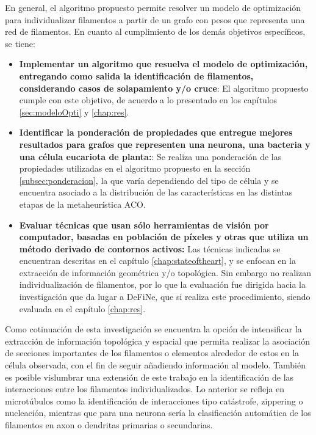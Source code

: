 En general, el algoritmo propuesto permite resolver un modelo de optimizaci\'on para individualizar filamentos a partir de un grafo con pesos que representa una red de filamentos. En cuanto al cumplimiento de los dem\'as objetivos espec\'ificos, se tiene:
\begin{itemize}
    \item {\bf Implementar un algoritmo que resuelva el modelo de optimizaci\'on, entregando como salida la identificaci\'on de filamentos, considerando casos de solapamiento y/o cruce}: El algoritmo propuesto cumple con este objetivo, de acuerdo a lo presentado en los cap\'itulos \ref{sec:modeloOpti} y \ref{chap:res}.
    
    \item {\bf Identificar la ponderaci\'on de propiedades que entregue mejores resultados para grafos que representen una neurona, una bacteria y una c\'elula eucariota de planta:}: Se realiza una ponderaci\'on de las propiedades utilizadas en el algoritmo propuesto en la secci\'on \ref{subsec:ponderacion}, la que var\'ia dependiendo del tipo de c\'elula y se encuentra asociado a la distribuci\'on de las caracter\'isticas en las distintas etapas de la metaheur\'istica ACO.
    
    \item {\bf Evaluar t\'ecnicas que usan s\'olo herramientas de visi\'on por computador, basadas en poblaci\'on de p\'ixeles y otras que utiliza un m\'etodo derivado de contornos activos:} Las t\'ecnicas indicadas se encuentran descritas en el cap\'itulo \ref{chap:stateoftheart}, y se enfocan en la extracci\'on de informaci\'on geom\'etrica y/o topol\'ogica. Sin embargo no realizan individualizaci\'on de filamentos, por lo que la evaluaci\'on fue dirigida hacia la investigaci\'on que da lugar a DeFiNe, que si realiza este procedimiento, siendo evaluada en el cap\'itulo \ref{chap:res}.
\end{itemize}


Como cotinuaci\'on de esta investigaci\'on se encuentra la opci\'on de intensificar la extracci\'on de informaci\'on topol\'ogica y espacial que permita realizar la asociaci\'on de secciones importantes de los filamentos o elementos alrededor de estos en la c\'elula observada, con el fin de seguir a\~nadiendo informaci\'on al modelo. Tambi\'en es posible vislumbrar una extensi\'on de este trabajo en la identificaci\'on de las interacciones entre los filamentos individualizados. Lo anterior se refleja en microt\'ubulos como la identificaci\'on de interacciones tipo cat\'astrofe, zippering o nucleaci\'on, mientras que para una neurona ser\'ia la clasificaci\'on autom\'atica de los filamentos en axon o dendritas primarias o secundarias.